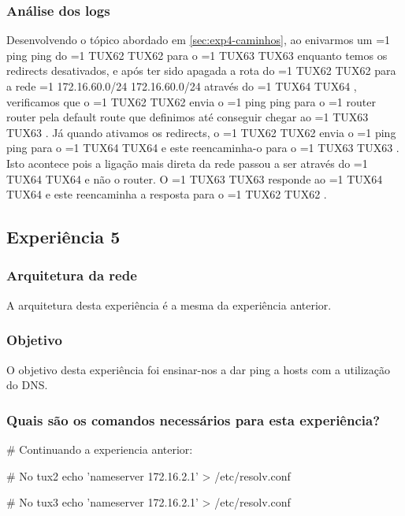 \documentclass[11pt,a4paper]{article}
\newcommand{\hl}[2][1]{%
  \ifnum#1=1\relax
    \textcolor{text-hl1}{#2}%
  \else
    \textcolor{text-hl2}{#2}%
  \fi
}
\begin{document}
\begin{multicols}{2}
\subsubsection{Análise dos logs}

Desenvolvendo o tópico abordado em \ref{sec:exp4-caminhos}, ao enivarmos um \hl{ping} do \hl[2]{TUX62} para o \hl[2]{TUX63} enquanto temos os redirects desativados, e após ter sido apagada a rota do \hl{TUX62} para a rede \hl{172.16.60.0/24} através do \hl{TUX64}, verificamos que o \hl{TUX62} envia o \hl{ping} para o \hl[2]{router} pela default route que definimos até conseguir chegar ao \hl{TUX63}.
Já quando ativamos os redirects, o \hl{TUX62} envia o \hl{ping} para o \hl{TUX64} e este reencaminha-o para o \hl{TUX63}. Isto acontece pois a ligação mais direta da rede passou a ser através do \hl{TUX64} e não o router. O \hl{TUX63} responde ao \hl{TUX64} e este reencaminha a resposta para o \hl{TUX62}. 

\subsection{Experiência 5}

\subsubsection{Arquitetura da rede}

A arquitetura desta experiência é a mesma da experiência anterior.

\subsubsection{Objetivo}

O objetivo desta experiência foi ensinar-nos a dar ping a hosts com a utilização do DNS.

\subsubsection{Quais são os comandos necessários para esta experiência?}

\begin{bash-darktheme}
    # Continuando a experiencia anterior:

    # No tux2
    echo 'nameserver 172.16.2.1' > /etc/resolv.conf
    
    # No tux3
    echo 'nameserver 172.16.2.1' > /etc/resolv.conf

\end{bash-darktheme}


\end{multicols}
\end{document}
